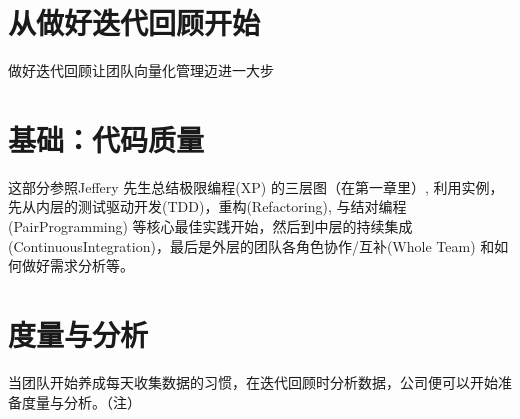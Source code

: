 \documentclass{book}        %
\begin{document}
\part{从做好迭代回顾开始 }做好迭代回顾让团队向量化管理迈进一大步\\



\part{基础：代码质量}这部分参照Jeffery 先生总结极限编程(XP) 的三层图（在第一章里）, 利用实例，先从内层的测试驱动开发(TDD)，重构(Refactoring), 与结对编程(PairProgramming) 等核心最佳实践开始，然后到中层的持续集成(ContinuousIntegration)，最后是外层的团队各角色协作/互补(Whole Team) 和如何做好需求分析等。





\part{度量与分析}当团队开始养成每天收集数据的习惯，在迭代回顾时分析数据，公司便可以开始准备度量与分析。（注）

\end{document}

